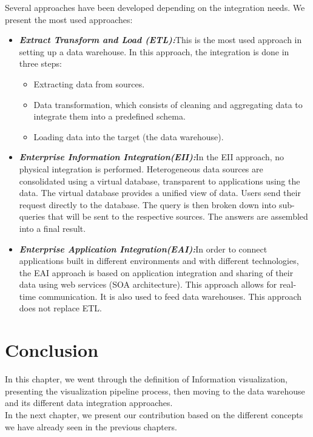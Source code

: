 Several approaches have been developed depending on the integration needs. We present the most used approaches\cite{naitEntropot}:
\begin{itemize}
  \renewcommand{\labelitemi}{$\bullet$}
  \item \textbf{\textit{Extract Transform and Load (ETL):}}\newline This is the most used approach in setting up a data warehouse. In this approach, the integration is done in three steps:
\begin{itemize}
\item Extracting data from sources.
\item Data transformation, which consists of cleaning and aggregating data to integrate them into a predefined schema.
\item Loading data into the target (the data warehouse).
\end{itemize}

  \item \textbf{\textit{Enterprise Information Integration(EII):}}\newline In the EII approach, no physical integration is performed. Heterogeneous data sources are consolidated using a virtual database, transparent to applications using the data. The virtual database provides a unified view of data. Users send their request directly to the database. The query is then broken down into sub-queries that will be sent to the respective sources. The answers are assembled into a final result.
  \item \textbf{\textit{Enterprise Application Integration(EAI):}}\newline In order to connect applications built in different environments and with different technologies, the EAI approach is based on application integration and sharing of their data using web services (SOA architecture). This approach allows for real-time communication.
It is also used to feed data warehouses. This approach does not replace ETL.
\end{itemize}



\section{Conclusion}
In this chapter, we went through the definition of Information visualization, presenting the visualization pipeline process, then moving to the data warehouse and its different data integration approaches.\\
In the next chapter, we present our contribution based on the different concepts we have already seen in the previous chapters.
